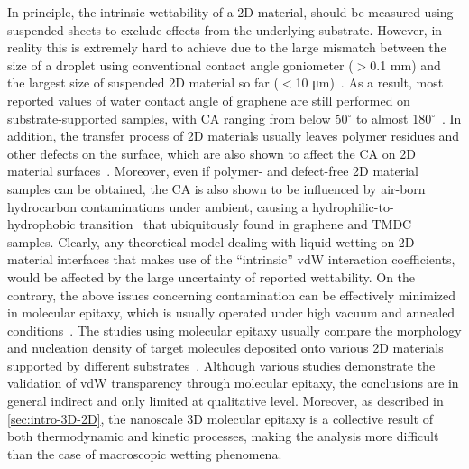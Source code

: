 %
In principle, the intrinsic wettability of a 2D material, should be
measured using suspended sheets to exclude effects from the underlying
substrate.
%
However, in reality this is extremely hard to achieve due to the large
mismatch between the size of a droplet using conventional contact
angle goniometer ($>$0.1 mm) and the largest size of suspended 2D
material so far ($<$10 μm)~\cite{Zhang_2017_transfer_suspended}.
%
As a result, most reported values of water contact angle of graphene
are still performed on substrate-supported samples, with CA ranging
from below 50$^{\circ}$ to almost
180$^{\circ}$~\cite{Kozbial_study_2014_gr_wetting,Raj_2013_wetting_rev,Wang_2009_wettability}.
%
In addition, the transfer process of 2D materials usually leaves
polymer residues and other defects on the surface, which are also
shown to affect the CA on 2D material surfaces~\cite{Kozbial_2015_wetting_mos2}.
%
Moreover, even if polymer- and defect-free 2D material samples can be
obtained, the CA is also shown to be influenced by air-born
hydrocarbon contaminations under ambient, causing a
hydrophilic-to-hydrophobic transition~\cite{li_2013_airborne} that ubiquitously found in graphene and
TMDC~\cite{Chow_2015_wetting_WS2} samples.
%
Clearly, any theoretical model dealing with liquid wetting on 2D
material interfaces that makes use of the ``intrinsic'' vdW
interaction coefficients, would be affected by the
large uncertainty of reported wettability.
%
On the contrary, the above issues concerning contamination can be
effectively minimized in molecular epitaxy, which is usually operated
under high vacuum and annealed conditions~\cite{Koma_1985_vdWE}.
%
%
The studies using molecular epitaxy usually compare the morphology and
nucleation density of target molecules deposited onto various 2D
materials supported by different substrates~\cite{Kratzer_2016_6P_gr_trans,Nguyen_2015_pent_gr_wett}.
%
Although various studies demonstrate the validation of vdW
transparency through molecular epitaxy, the conclusions are in general
indirect and only limited at qualitative level.
%
Moreover, as described in \autoref{sec:intro-3D-2D}, the nanoscale 3D
molecular epitaxy is a collective result of both thermodynamic and
kinetic processes, making the analysis more difficult than the case of
macroscopic wetting phenomena.


